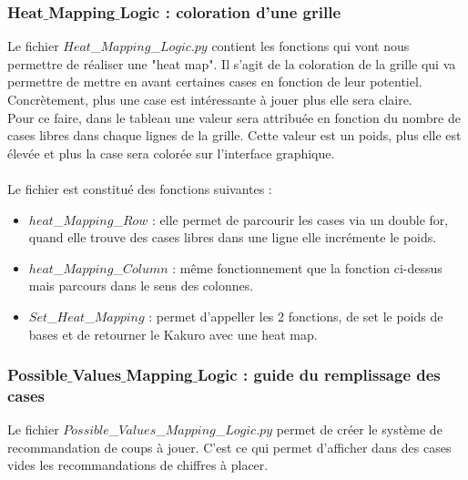 \documentclass[french,12pt]{article}
\begin{document}
\subsubsection{Heat$\_$Mapping$\_$Logic : coloration d'une grille}

Le fichier $Heat$\_$Mapping$\_$Logic.py$ contient les fonctions qui vont nous permettre de réaliser une "heat map". Il s'agit de la coloration de la grille qui va permettre de mettre en avant certaines cases en fonction de leur potentiel. Concrètement, plus une case est intéressante à jouer plus elle sera claire. \\
Pour ce faire, dans le tableau une valeur sera attribuée en fonction du nombre de cases libres dans chaque lignes de la grille. Cette valeur est un poids, plus elle est élevée et plus la case sera colorée sur l'interface graphique.  \\ \\

Le fichier est constitué des fonctions suivantes : \\
\begin{itemize}

\item[]$heat$\_$Mapping$\_$Row$ : elle permet de parcourir les cases via un double for, quand elle trouve des cases libres dans  une ligne elle incrémente le poids. \\

\item[]$heat$\_$Mapping$\_$Column$ : même fonctionnement que la fonction ci-dessus mais parcours dans le sens des colonnes. \\

\item[]$Set$\_$Heat$\_$Mapping$ : permet d'appeller les 2 fonctions, de set le poids de bases et de retourner le Kakuro avec une heat map.\\
\end{itemize}

\subsubsection{Possible$\_$Values$\_$Mapping$\_$Logic : guide du remplissage des cases}
Le fichier $Possible$\_$Values$\_$Mapping$\_$Logic.py$ permet de créer le système de recommandation de coups à jouer. C'est ce qui permet d'afficher dans des cases vides les recommandations de chiffres à placer. \\ \\
\end{document}
